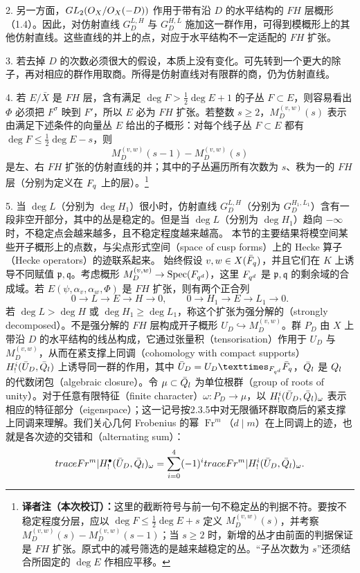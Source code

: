 2. 另一方面，$GL_2(O_X/O_X(-D))$ 作用于带有沿 $D$ 的水平结构的 $FH$ 层概形（1.4）。因此，对仿射直线 $G_D^{L,H}$ 与 $G_D^{H,L}$ 施加这一群作用，可得到模概形上的其他仿射直线。这些直线的并上的点，对应于水平结构不一定适配的 $FH$ 扩张。

3. 若去掉 $D$ 的次数必须很大的假设，本质上没有变化。可先转到一个更大的除子，再对相应的群作用取商。所得是仿射直线对有限群的商，仍为仿射直线。

4. 若 $E/\bar X$ 是 $FH$ 层，含有满足 $\deg F>\frac12\deg E+1$ 的子丛 $F\subset E$，则容易看出 $\Phi$ 必须把 $F^\sigma$ 映到 $F'$，所以 $E$ 必为 $FH$ 扩张。若整数 $s\geq2$，$M_D^{(v,w)}(s)$ 表示由满足下述条件的向量丛 $E$ 给出的子概形：对每个线子丛 $F\subset E$ 都有
$\deg F\leq\frac12\deg E-s$，则
\[
M_D^{(v,w)}(s-1)-M_D^{(v,w)}(s)
\]
是左、右 $FH$ 扩张的仿射直线的并；其中的子丛遍历所有次数为 $s$、秩为一的 $FH$ 层（分别为定义在 $F_q$ 上的层）。\footnote{\textbf{译者注（本次校订）：}这里的截断符号与前一句不稳定丛的判据不符。要按不稳定程度分层，应以 $\deg F\leq\tfrac12\deg E+s$ 定义 $M_D^{(v,w)}(s)$，并考察 $M_D^{(v,w)}(s)-M_D^{(v,w)}(s-1)$；当 $s\geq2$ 时，新增的丛才由前面的判据保证是 $FH$ 扩张。原式中的减号筛选的是越来越稳定的丛。“子丛次数为 $s$”还须结合所固定的 $\deg E$ 作相应平移。}

5. 当 $\deg L$（分别为 $\deg H_1$）很小时，仿射直线 $G_D^{L,H}$（分别为 $G_D^{H_1,L_1}$）含有一段非空开部分，其中的丛是稳定的。但是当 $\deg L$（分别为 $\deg H_1$）趋向 $-\infty$ 时，不稳定点会越来越多，且不稳定程度越来越高。
本节的主要结果将模空间某些开子概形上的点数，与尖点形式空间（space of cusp forms）上的 Hecke 算子（Hecke operators）的迹联系起来。
始终假设 $v,w\in X(\bar{F}_q)$，并且它们在 $K$ 上诱导不同赋值 $\mathfrak p,\mathfrak q$。考虑概形
$M_D^{(v,w)}\to\Spec(\F_{q^d})$，这里 $F_{q^d}$ 是 $\mathfrak p,\mathfrak q$ 的剩余域的合成域。若 $E(\psi,\alpha_v,\alpha_w,\Phi)$ 是 $FH$ 扩张，则有两个正合列
\[
0\to L\to E\to H\to0,\qquad0\to H_1\to E\to L_1\to0.
\]
若 $\deg L>\deg H$ 或 $\deg H_1\geq\deg L_1$，称这个扩张为强分解的（strongly decomposed）。不是强分解的 $FH$ 层构成开子概形
$U_D\hookrightarrow M_D^{(v,w)}$。群 $P_D$ 由 $X$ 上带沿 $D$ 的水平结构的线丛构成，它通过张量积（tensorisation）作用于 $U_D$ 与 $M_D^{(v,w)}$，从而在紧支撑上同调（cohomology with compact supports）
$H_!^i(\bar U_D,\bar{Q}_l)$ 上诱导同一群的作用，其中
$\bar U_D=U_D\times_{\F_{q^d}}\bar\F_q$，$\bar{Q}_l$ 是 $Q_l$ 的代数闭包（algebraic closure）。令 $\mu\subset\bar{Q}_l$ 为单位根群（group of roots of unity）。对于任意有限特征（finite character）$\omega:P_D\to\mu$，以 $H_!^i(\bar U_D,\bar{Q}_l)_\omega$ 表示相应的特征部分（eigenspace）；这一记号按2.3.5中对无限循环群取商后的紧支撑上同调来理解。我们关心几何 Frobenius 的幂 $\operatorname{Fr}^m$（$d\mid m$）在上同调上的迹，也就是各次迹的交错和（alternating sum）：
\[
traceFr^m|H_!^\bullet(\bar U_D,\bar{Q}_l)_\omega
=\sum_{i=0}^4(-1)^itraceFr^m|H_!^i(\bar U_D,\bar{Q}_l)_\omega.
\]

